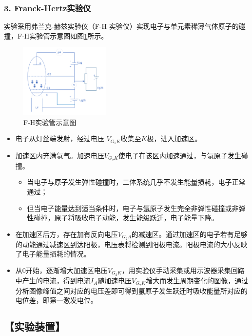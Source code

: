 \documentclass[12pt,a4paper,UTF8]{ctexart}
\begin{document}
    \subsubsection*{3. Franck-Hertz实验仪}
		实验采用弗兰克-赫兹实验仪（F-H 实验仪）实现电子与单元素稀薄气体原子的碰撞，F-H实验管示意图如图\ref{fig:illus-1}所示。
		\begin{figure}[htbp]
			\centering
			\includegraphics[width=0.4\textwidth]{attachments/C2_illus-1.png}
			\caption{F-H实验管示意图}
			\label{fig:illus-1}
		\end{figure}
		\begin{itemize}
			\item 电子从灯丝端发射，经过电压 $V_{G_1K}$收集至$ K $极，进入加速区。
			\item 加速区内充满氩气。加速电压$V_{G_2K}$使电子在该区内加速通过，与氩原子发生碰撞。
			\begin{itemize}
				\item 当电子与原子发生弹性碰撞时，二体系统几乎不发生能量损耗，电子正常通过；
				\item 但当电子能量达到适当条件时，电子与氩原子发生完全非弹性碰撞或非弹性碰撞，原子将吸收电子动能，发生能级跃迁，电子能量下降。
			\end{itemize}
			\item 在加速区后方，存在加有反向电压$V_{G_2A}$的减速区。通过加速区的电子若有足够的动能通过减速区到达阳极，电压表将检测到阳极电流。阳极电流的大小反映了电子能量损耗的情况。
			\item 从$0$开始，逐渐增大加速区电压$V_{G_2K}$，用实验仪手动采集或用示波器采集回路中产生的电流，得到电流$I_A$随加速电压$V_{G_2K}$增大而发生周期变化的图像，通过分析图像峰值之间对应的电压差即可得到氩原子发生跃迁时吸收能量所对应的电位差，即第一激发电位。
		\end{itemize}

\subsection*{【实验装置】}
\end{document}
